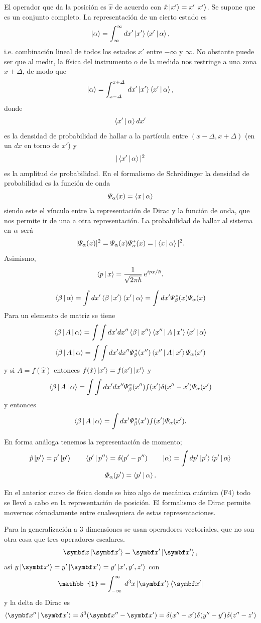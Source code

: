 \documentclass[10pt,oneside]{CBFT_book}
\begin{document}
El operador que da la posición es $\hat{x}$ de acuerdo con $\hat{x}\Ket{x'} = x'\Ket{x'}$.
Se supone que es un conjunto completo.
La representación de un cierto estado es
\[
	\Ket{\alpha} = \int_{\infty}^\infty dx' \Ket{x'}\Braket{x'|\alpha},
\]
i.e. combinación lineal de todos los estados $x'$ entre $-\infty$ y $\infty$. No obstante puede
ser que al medir, la física del instrumento o de la medida nos restringe a una zona
$x \pm \Delta$, de modo que
\[
	\Ket{\alpha} = \int_{x-\Delta}^{x+\Delta} \: dx' \Ket{x'}\Braket{x'|\alpha},
\]
donde 
\[
	\Braket{x'|\alpha}dx'
\]
es la densidad de probabilidad de hallar a la partícula entre $(x-\Delta,x+\Delta)$ 
(en un $dx$ en torno de $x'$) y 
\[
	|\Braket{x'|\alpha}|^2
\]
es la amplitud de probabilidad. 
En el formalismo de Schrödinger la densidad de probabilidad es la función de onda
\[
	\Psi_\alpha(x) = \Braket{x|\alpha}
\]
siendo este el vínculo entre la representación de Dirac y la función de onda,
que nos permite ir de una a otra representación.
La probabilidad de hallar al sistema en $\alpha$ será
\[
	| \Psi_\alpha(x) |^2 = \Psi_\alpha(x) \Psi^*_\alpha(x) = | \Braket{x|\alpha} |^2.
\]
Asimismo,
\[
	\Braket{p|x} = \frac{1}{\sqrt{2 \pi \hbar}} \:\mathrm{e}^{i p x / \hbar}.
\]

\[
	\Braket{\beta|\alpha} = \int dx' \Braket{\beta|x'}\Braket{x'|\alpha} = 
		\int dx' \Psi_\beta^*(x) \Psi_\alpha(x)
\]
Para un elemento de matriz se tiene
\[
	\Braket{\beta|A|\alpha} = 
	\int \int dx' dx''\Braket{\beta|x''}\Braket{x''|A|x'}\Braket{x'|\alpha}
\]
\[
	\Braket{\beta|A|\alpha} = 
	\int \int dx' dx'' \Psi_\beta^*(x'') \Braket{x''|A|x'} \Psi_\alpha(x')
\]
y si $A=f(\hat{x})$ entonces $f(\hat{x}) \Ket{x'} = f(x') \Ket{x'}$ y
\[
	\Braket{\beta|A|\alpha} = 
	\int \int dx' dx'' \Psi_\beta^*(x'') f(x')\delta(x''-x') \Psi_\alpha(x')
\]
y entonces 
\[
	\Braket{\beta|A|\alpha} = \int dx' \Psi_\beta^*(x') f(x') \Psi_\alpha(x').
\]

En forma análoga tenemos la representación de momento;
\[
	\hat{p}\Ket{p'} = p'\Ket{p'} \qquad \Braket{p'|p''} = \delta(p'-p'') \qquad 
	\Ket{\alpha} = \int dp' \Ket{p'}\Braket{p'|\alpha}
\]
\[
	\Phi_\alpha(p') = \Braket{p'|\alpha}.
\]

En el anterior curso de física donde se hizo algo de mecánica cuántica (F4) todo
se llevó a cabo en la representación de posición.
El formalismo de Dirac permite movernos cómodamente entre cualesquiera de estas
representaciones.

Para la generalización a 3 dimensiones se usan operadores vectoriales, que no son otra
cosa que tres operadores escalares.
\[
	\vb x \Ket{\vb{x}'} = \vb{x'} \Ket{\vb{x'}},
\]
así $y \Ket{\vb{x}'} = y' \Ket{\vb{x}'} = y' \Ket{x',y',z'}$ con
\[
	\mathbb{1} = \int_{-\infty}^{\infty} \: d^3x \KB{ \vb{x'} }{ \vb{x'} }
\]
y la delta de Dirac es
\[
	\Braket{\vb{x''}|\vb{x'}} = \delta^3(\vb{x''} - \vb{x'}) =
	\delta( x'' - x' )\delta( y'' - y' )\delta( z'' - z' )
\]
\end{document}
